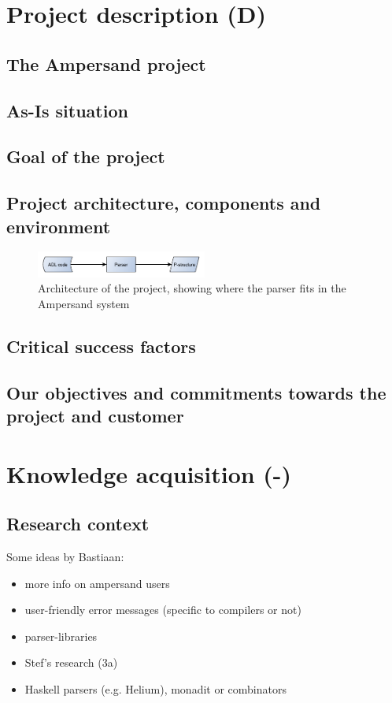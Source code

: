 
\section{Project description (D)}
\label{sec:project-description}
\subsection{The Ampersand project}
\subsection{As-Is situation}
\subsection{Goal of the project}
\subsection{Project architecture, components and environment}
\begin{figure}[hb]
  \centering
  \includegraphics[width=0.5\textwidth]{Architecture}
  \caption[Architecture of the project]{Architecture of the project, showing where the parser fits in the Ampersand system}
\end{figure}

\subsection{Critical success factors}
\subsection{Our objectives and commitments towards the project and customer}

\section{Knowledge acquisition (-)}
\label{sec:knowledge-acquisition}
\subsection{Research context}
Some ideas by Bastiaan:
\begin{itemize}
  \item more info on ampersand users
  \item user-friendly error messages (specific to compilers or not)
  \item parser-libraries
  \item Stef's research (3a)
  \item Haskell parsers (e.g. Helium), monadit or combinators
\end{itemize}

